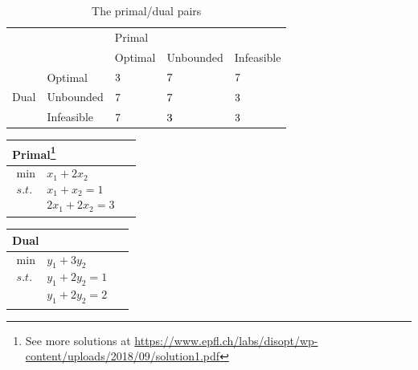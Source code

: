 \documentclass[11pt]{article}
\numberwithin{equation}{section}
\begin{document}
\begin{table}[H]
    \centering
    \begin{tabular}{|l|l|l|l|l|}
    \hline
    \multicolumn{2}{|l|}{\multirow{2}{*}{}} & \multicolumn{3}{l|}{Primal}      \\ \cline{3-5} 
    \multicolumn{2}{|l|}{}                  & Optimal & Unbounded & Infeasible \\ \hline
    \multirow{3}{*}{Dual}    & Optimal      & $\cmark$& $\xmark$  & $\xmark$   \\ \cline{2-5} 
                             & Unbounded    & $\xmark$& $\xmark$  & $\cmark$   \\ \cline{2-5} 
                             & Infeasible   & $\xmark$& $\cmark$  & $\cmark$   \\ \hline
    \end{tabular}
    \caption{The primal/dual pairs }
\end{table}

\begin{example}
    \begin{minipage}[t]{.5\linewidth}
        \vspace{0pt}
        \centering
        \begin{tabular}{ll}
            Primal\footnote{See more solutions at \url{https://www.epfl.ch/labs/disopt/wp-content/uploads/2018/09/solution1.pdf}} \\ \hline
            \parbox{5cm}{\begin{align*}
                \min \ &x_1+2 x_{2} \\
                s.t.\ & x_1+x_{2}=1 \\
                &2 x_{1}+2 x_{2}=3
            \end{align*}}
        \end{tabular}
    \end{minipage}%
    \begin{minipage}[t]{.5\linewidth}
        \vspace{0pt}
        \centering
        \begin{tabular}{ll}
            Dual \\ \hline
            \parbox{5cm}{\begin{align*}
                \min \ &y_1+3 y_{2} \\
                s.t.\ & y_1+2y_{2}=1 \\
                &y_{1}+2 y_{2}=2
            \end{align*}}
        \end{tabular}
    \end{minipage}
\end{example}
\end{document}
